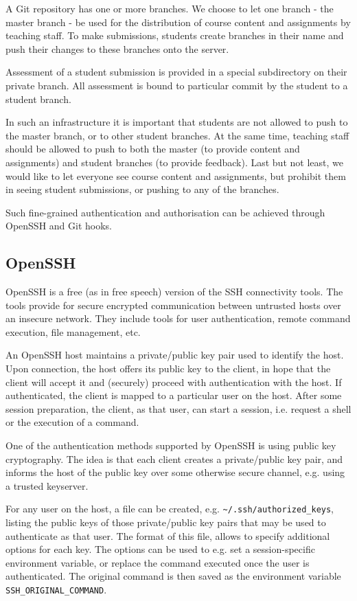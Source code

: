 A Git repository has one or more branches. We choose to let one branch - the
master branch - be used for the distribution of course content and assignments
by teaching staff. To make submissions, students create branches in their name
and push their changes to these branches onto the server.

Assessment of a student submission is provided in a special subdirectory on
their private branch. All assessment is bound to particular commit by the
student to a student branch.

In such an infrastructure it is important that students are not allowed to push
to the master branch, or to other student branches. At the same time, teaching
staff should be allowed to push to both the master (to provide content and
assignments) and student branches (to provide feedback). Last but not least, we
would like to let everyone see course content and assignments, but prohibit
them in seeing student submissions, or pushing to any of the branches.

Such fine-grained authentication and authorisation can be achieved through
OpenSSH and Git hooks.

\subsection{OpenSSH}

OpenSSH is a free (as in free speech) version of the SSH connectivity
tools\cite{openssh-com-2014}.  The tools provide for secure encrypted
communication between untrusted hosts over an insecure network\cite{man-1-ssh}.
They include tools for user authentication, remote command execution, file
management, etc.

An OpenSSH host maintains a private/public key pair used to identify the host.
Upon connection, the host offers its public key to the client, in hope that the
client will accept it and (securely) proceed with authentication with the host.
If authenticated, the client is mapped to a particular user on the host.  After
some session preparation, the client, as that user, can start a session, i.e.
request a shell or the execution of a command.

One of the authentication methods supported by OpenSSH is using public key
cryptography. The idea is that each client creates a private/public key pair,
and informs the host of the public key over some otherwise secure channel, e.g.
using a trusted keyserver.

For any user on the host, a file can be created, e.g.
\texttt{\textasciitilde/.ssh/authorized\_keys}, listing the public keys of
those private/public key pairs that may be used to authenticate as that user.
The format of this file\cite{man-8-sshd}, allows to specify additional options
for each key. The options can be used to e.g. set a session-specific
environment variable, or replace the command executed once the user is
authenticated. The original command is then saved as the environment variable
\texttt{SSH\_ORIGINAL\_COMMAND}.

